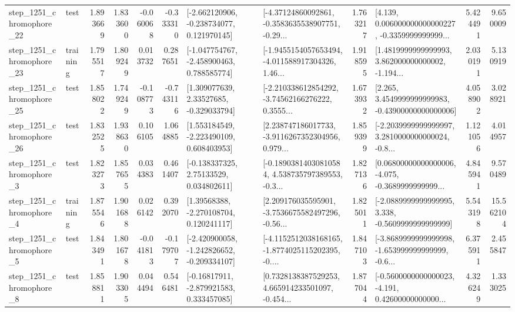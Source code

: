 \begin{tabular}{llrrrrllrlrr}
 step\_1251\_chromophore\_22 &      test &      1.893669 &    1.833600 &     -0.060068 & -0.333310 &   [-2.662120906, -0.238734077, 0.121970145] &  [-4.37124860092861, -0.3583635538907751, -0.29... &       1.763217 &  [4.139, 0.006000000000000227, -0.3359999999999... &            5.424491 &          9.650009 \\
 step\_1251\_chromophore\_23 &  training &      1.795517 &    1.809249 &      0.013732 &  0.287651 &   [-1.047754767, -2.458900463, 0.788585774] &  [-1.9455154057653494, -4.011588917304326, 1.46... &       1.918595 &  [1.4819999999999993, 3.862000000000002, -1.194... &            2.030191 &          5.130919 \\
 step\_1251\_chromophore\_25 &      test &      1.858022 &    1.749249 &     -0.108773 & -0.743116 &     [1.309077639, 2.33527685, -0.329033794] &  [-2.210338612854292, -3.74562166276222, 0.3555... &       1.673932 &  [2.265, 3.4549999999999983, -0.43900000000000006] &            4.058902 &          3.028921 \\
 step\_1251\_chromophore\_26 &      test &      1.832525 &    1.938630 &      0.106105 &  1.064885 &    [1.553184549, -2.223490109, 0.608403953] &  [2.238747186017733, -3.9116267352304956, 0.979... &       1.859399 &  [-2.2039999999999997, 3.2810000000000024, -0.8... &            1.121056 &          4.014957 \\
  step\_1251\_chromophore\_3 &      test &      1.823273 &    1.857655 &      0.034383 &  0.461407 &     [-0.138337325, 2.75133529, 0.034802611] &  [-0.18903814030810584, 4.538735797389553, -0.3... &       1.827136 &  [0.06800000000000006, -4.075, -0.3689999999999... &            4.845941 &          9.570489 \\
  step\_1251\_chromophore\_4 &  training &      1.875546 &    1.901688 &      0.026142 &  0.392070 &     [1.39568388, -2.270108704, 0.120241117] &  [2.209176035595901, -3.7536675582497296, -0.56... &       1.825011 &  [-2.0889999999999995, 3.338, -0.5609999999999999] &            5.543198 &         15.562104 \\
  step\_1251\_chromophore\_5 &      test &      1.843491 &    1.801678 &     -0.041813 & -0.179707 &  [-2.420900058, -1.242826652, -0.209334107] &  [-4.1152512038168165, -1.8774025115202395, -0.... &       1.847103 &  [-3.8689999999999998, -1.653999999999999, -0.6... &            6.375911 &          2.455847 \\
  step\_1251\_chromophore\_8 &      test &      1.858811 &    1.903305 &      0.044494 &  0.546481 &    [-0.16817911, -2.879921583, 0.333457085] &  [0.7328138387529253, 4.665914233501097, -0.454... &       1.877044 &  [-0.5600000000000023, -4.191, 0.42600000000000... &            4.326249 &          1.333025 \\

\end{tabular}
